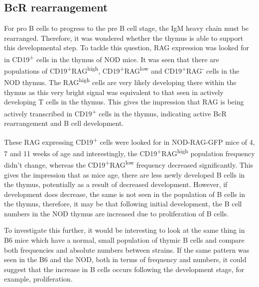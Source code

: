 



\subsection{BcR rearrangement}
For pro B cells to progress to the pre B cell stage, the IgM heavy chain must be rearranged.
Therefore, it was wondered whether the thymus is able to support this developmental step.
To tackle this question, RAG expression was looked for in CD19\textsuperscript{+} cells in the thymus of NOD mice.
It was seen that there are populations of CD19\textsuperscript{+}RAG\textsuperscript{high}, CD19\textsuperscript{+}RAG\textsuperscript{low} and CD19\textsuperscript{+}RAG\textsuperscript{-} cells in the NOD thymus.
The RAG\textsuperscript{high} cells are very likely developing there within the thymus as this very bright signal was equivalent to that seen in actively developing T cells in the thymus.
This gives the impression that RAG is being actively transcribed in CD19\textsuperscript{+} cells in the thymus, indicating active BcR rearrangement and B cell development.

These RAG expressing CD19\textsuperscript{+} cells were looked for in NOD-RAG-GFP mice of 4, 7 and 11 weeks of age and interestingly, the CD19\textsuperscript{+}RAG\textsuperscript{high} population frequency didn't change, whereas the CD19\textsuperscript{+}RAG\textsuperscript{low} frequency decreased significantly.
This gives the impression that as mice age, there are less newly developed B cells in the thymus, potentially as a result of decreased development.
However, if development does decrease, the same is not seen in the population of B cells in the thymus, therefore, it may be that following initial development, the B cell numbers in the NOD thymus are increased due to proliferation of B cells.

To investigate this further, it would be interesting to look at the same thing in B6 mice which have a normal, small population of thymic B cells and compare both frequencies and absolute numbers between strains.
If the same pattern was seen in the B6 and the NOD, both in terms of frequency and numbers, it could suggest that the increase in B cells occurs following the development stage, for example, proliferation.

